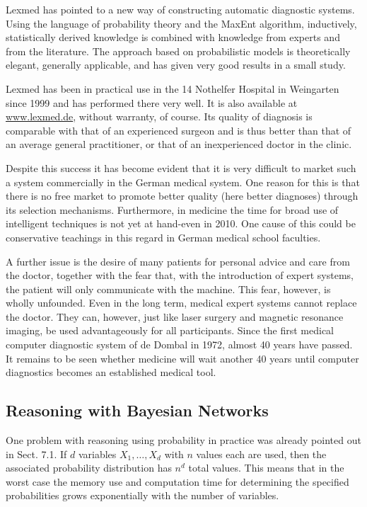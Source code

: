 \documentclass[10pt]{article}
\begin{document}
Lexmed has pointed to a new way of constructing automatic diagnostic systems. Using the language of probability theory and the MaxEnt algorithm, inductively,\\
statistically derived knowledge is combined with knowledge from experts and from the literature. The approach based on probabilistic models is theoretically elegant, generally applicable, and has given very good results in a small study.

Lexmed has been in practical use in the 14 Nothelfer Hospital in Weingarten since 1999 and has performed there very well. It is also available at \href{http://www.lexmed.de}{www.lexmed.de}, without warranty, of course. Its quality of diagnosis is comparable with that of an experienced surgeon and is thus better than that of an average general practitioner, or that of an inexperienced doctor in the clinic.

Despite this success it has become evident that it is very difficult to market such a system commercially in the German medical system. One reason for this is that there is no free market to promote better quality (here better diagnoses) through its selection mechanisms. Furthermore, in medicine the time for broad use of intelligent techniques is not yet at hand-even in 2010. One cause of this could be conservative teachings in this regard in German medical school faculties.

A further issue is the desire of many patients for personal advice and care from the doctor, together with the fear that, with the introduction of expert systems, the patient will only communicate with the machine. This fear, however, is wholly unfounded. Even in the long term, medical expert systems cannot replace the doctor. They can, however, just like laser surgery and magnetic resonance imaging, be used advantageously for all participants. Since the first medical computer diagnostic system of de Dombal in 1972, almost 40 years have passed. It remains to be seen whether medicine will wait another 40 years until computer diagnostics becomes an established medical tool.

\subsection*{Reasoning with Bayesian Networks}
One problem with reasoning using probability in practice was already pointed out in Sect. 7.1. If $d$ variables $X_{1}, \ldots, X_{d}$ with $n$ values each are used, then the associated probability distribution has $n^{d}$ total values. This means that in the worst case the memory use and computation time for determining the specified probabilities grows exponentially with the number of variables.
\end{document}
